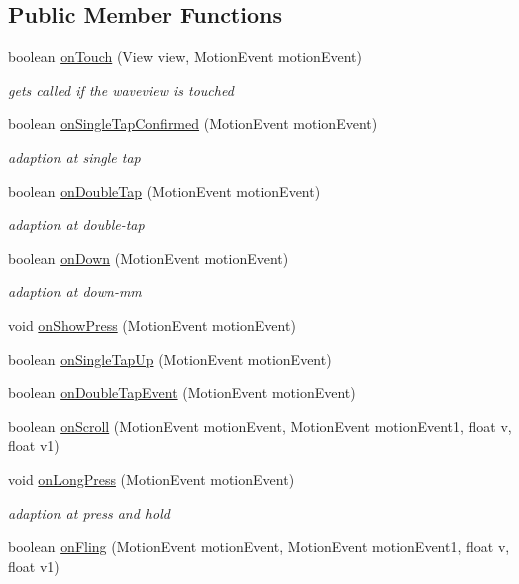 \subsection*{Public Member Functions}
\begin{DoxyCompactItemize}
\item 
boolean \hyperlink{classInterface_1_1WaveViewTouchListener_a930822512b04099bee06d86d22ed9eb3}{on\+Touch} (View view, Motion\+Event motion\+Event)
\begin{DoxyCompactList}\small\item\em gets called if the waveview is touched \end{DoxyCompactList}\item 
boolean \hyperlink{classInterface_1_1WaveViewTouchListener_af5821ac49ff1adc78f2e519d2ef86618}{on\+Single\+Tap\+Confirmed} (Motion\+Event motion\+Event)
\begin{DoxyCompactList}\small\item\em adaption at single tap \end{DoxyCompactList}\item 
boolean \hyperlink{classInterface_1_1WaveViewTouchListener_ae1beb9324c54a572de4f2c3a7b82490d}{on\+Double\+Tap} (Motion\+Event motion\+Event)
\begin{DoxyCompactList}\small\item\em adaption at double-\/tap \end{DoxyCompactList}\item 
boolean \hyperlink{classInterface_1_1WaveViewTouchListener_a980778cc5d786e511fd40558eefce2c0}{on\+Down} (Motion\+Event motion\+Event)
\begin{DoxyCompactList}\small\item\em adaption at down-\/mm \end{DoxyCompactList}\item 
void \hyperlink{classInterface_1_1WaveViewTouchListener_a08d6e5f2549205f6a110dcfd337d3bff}{on\+Show\+Press} (Motion\+Event motion\+Event)
\item 
boolean \hyperlink{classInterface_1_1WaveViewTouchListener_a6d5684a1635ae017353b27779939d05d}{on\+Single\+Tap\+Up} (Motion\+Event motion\+Event)
\item 
boolean \hyperlink{classInterface_1_1WaveViewTouchListener_a28a8b25f4ec04dc073139c5ace7847bd}{on\+Double\+Tap\+Event} (Motion\+Event motion\+Event)
\item 
boolean \hyperlink{classInterface_1_1WaveViewTouchListener_a0c352cffa833af8806b3474d81896d9c}{on\+Scroll} (Motion\+Event motion\+Event, Motion\+Event motion\+Event1, float v, float v1)
\item 
void \hyperlink{classInterface_1_1WaveViewTouchListener_aad1a42b120542bc4467498f65fd18184}{on\+Long\+Press} (Motion\+Event motion\+Event)
\begin{DoxyCompactList}\small\item\em adaption at press and hold \end{DoxyCompactList}\item 
boolean \hyperlink{classInterface_1_1WaveViewTouchListener_af01d70fc2f16c91f5da43c8bdc269303}{on\+Fling} (Motion\+Event motion\+Event, Motion\+Event motion\+Event1, float v, float v1)
\end{DoxyCompactItemize}
